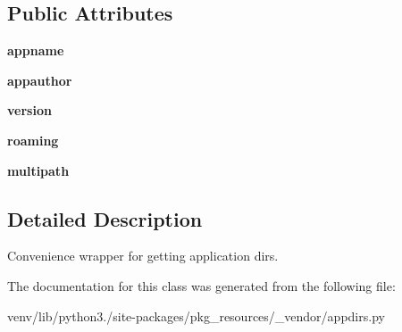 \subsection*{Public Attributes}
\begin{DoxyCompactItemize}
\item 
\mbox{\label{classpkg__resources_1_1__vendor_1_1appdirs_1_1_app_dirs_afed8cca9642ffb41bd6e08a7cd1c078a}} 
{\bfseries appname}
\item 
\mbox{\label{classpkg__resources_1_1__vendor_1_1appdirs_1_1_app_dirs_a69ef562eba9aecf3e8d06c73ebb6e1da}} 
{\bfseries appauthor}
\item 
\mbox{\label{classpkg__resources_1_1__vendor_1_1appdirs_1_1_app_dirs_af0b4120c1952529d4b9cf453a36a1939}} 
{\bfseries version}
\item 
\mbox{\label{classpkg__resources_1_1__vendor_1_1appdirs_1_1_app_dirs_aaa511bab76ea5c82e80096050df5ce87}} 
{\bfseries roaming}
\item 
\mbox{\label{classpkg__resources_1_1__vendor_1_1appdirs_1_1_app_dirs_a4292bc9bd6d97a7a696f731d4955ebf9}} 
{\bfseries multipath}
\end{DoxyCompactItemize}


\subsection{Detailed Description}
\begin{DoxyVerb}Convenience wrapper for getting application dirs.\end{DoxyVerb}
 

The documentation for this class was generated from the following file\+:\begin{DoxyCompactItemize}
\item 
venv/lib/python3./site-\/packages/pkg\+\_\+resources/\+\_\+vendor/appdirs.\+py\end{DoxyCompactItemize}
